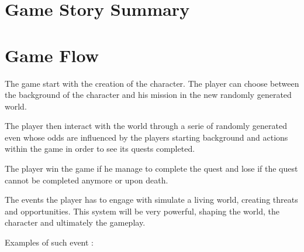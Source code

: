 \documentclass{report}
\begin{document}
	\section*{Game Story Summary}
		\begin{comment} TIPS
			if you are going to kill a character, first develop time with it and the player so bonds a created and it means something for it to die
			- Character classes
    			- Necromancer - Why/how/what/where
		\end{comment}


	\section*{Game Flow}
		\begin{comment}
			How does the player grow as the challenges increase? 
			How does this tie into the story? 
			Briefly describe how these systems will work (experience points, money, score, collectibles) and what the player gains as they grow (new abilities, weapons, additional moves, unlockables).
		\end{comment}

		The game start with the creation of the character. The player can choose between the background of the character and his mission in the new randomly generated world.

		The player then interact with the world through a serie of randomly generated even whose odds are influenced by the players starting background and actions within the game in order to see its quests completed.

		The player win the game if he manage to complete the quest and lose if the quest cannot be completed anymore or upon death.

		The events the player has to engage with simulate a living world, creating threats and opportunities. This system will be very powerful, shaping the world, the character and ultimately the gameplay.

		Examples of such event :
\end{document}
